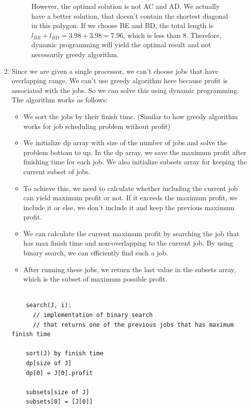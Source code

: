 \documentclass{article}
\begin{document}
\begin{enumerate}
\begin{figure}[H]
\begin{minipage}{0.4\textwidth}
      \caption{However, the optimal solution is not AC and AD.
      We actually have a better solution, that doesn't contain the shortest diagonal in this polygon.
      If we choose BE and BD, the total length is $l_{BE}+l_{BD}=3.98+3.98=7.96$, which is less than 8.
      Therefore, dynamic programming will yield the optimal result and not necessarily greedy algorithm.}
    \end{minipage}
  \end{figure}

  \item Since we are given a single processor, we can't choose jobs that have overlapping range.
  We can't use greedy algorithm here because profit is associated with the jobs.
  So we can solve this using dynamic programming.
  The algorithm works as follows:
  \begin{itemize}
    \item We sort the jobs by their finish time.
    (Similar to how greedy algorithm works for job scheduling problem without profit)
    \item We initialize dp array with size of the number of jobs and solve the problem bottom to up.
    In the dp array, we save the maximum profit after finishing time for each job.
    We also initialize subsets array for keeping the current subset of jobs.
    \item To achieve this, we need to calculate whether including the current job can yield maximum profit or not.
    If it exceeds the maximum profit, we include it or else, we don't include it and keep the previous maximum profit.
    \item We can calculate the current maximum profit by searching the job that has max finish time and non-overlapping to the current job.
    By using binary search, we can efficiently find such a job.
    \item After running these jobs, we return the last value in the subsets array, which is the subset of maximum possible profit.
  \end{itemize}

  \begin{lstlisting}

    search(J, i):
      // implementation of binary search
      // that returns one of the previous jobs that has maximum finish time

    sort(J) by finish time
    dp[size of J]
    dp[0] = J[0].profit

    subsets[size of J]
    subsets[0] = [J[0]]


\end{lstlisting}
\end{enumerate}
\end{document}
